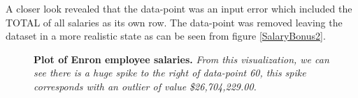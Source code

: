 \documentclass[twoside,openright,titlepage,numbers=noenddot,headinclude,%
               footinclude=true,cleardoublepage=empty,abstractoff,BCOR=5mm,%
               paper=a4,fontsize=11pt,ngerman,american]{scrreprt}
\numberwithin{theorem}{chapter}
\numberwithin{definition}{chapter}
\numberwithin{algorithm}{chapter}
\numberwithin{figure}{chapter}
\numberwithin{table}{chapter}
\numberwithin{equation}{chapter}
\begin{document}
 A closer look revealed that the data-point was an input error which included the TOTAL of all salaries as its own row. The data-point was removed leaving the dataset in a more realistic state as can be seen from figure \ref{SalaryBonus2}.

\begin{figure}[!hbtp]
\centering
    
    \caption{\textbf{Plot of Enron employee salaries.}\textit{ From this visualization, we can see there is a huge spike to the right of data-point 60, this spike corresponds with an outlier of value \$26,704,229.00.}}
\end{figure}
\end{document}
